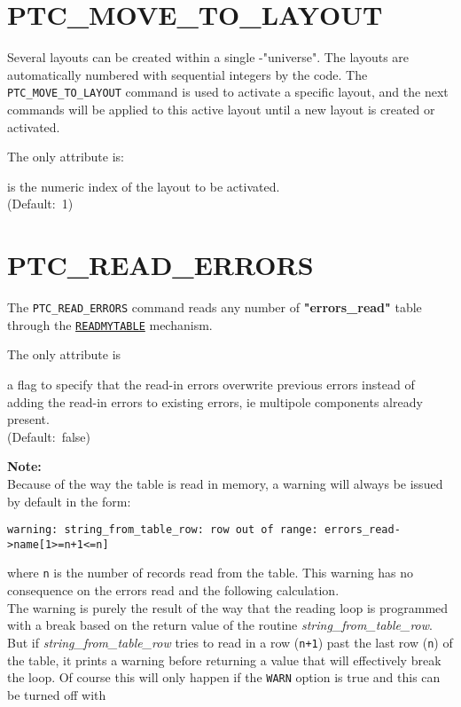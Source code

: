 \section{PTC\_MOVE\_TO\_LAYOUT}
\label{sec:ptc-move-to-layout}

Several \ptc layouts can be created within a single \ptc-"universe". 
The layouts are automatically numbered with sequential integers by the 
\madx code. The {\tt PTC\_MOVE\_TO\_LAYOUT} command is used to
activate a specific layout, and the next \ptc commands will be
applied to this active \ptc layout until a new \ptc layout is created
or activated. 


The only attribute is:
\begin{madlist}
	 is the numeric index of the \ptc layout to be
	activated.\\ (Default:~1)
\end{madlist}

\section{PTC\_READ\_ERRORS}
\label{sec:ptc-read-errors}

The {\tt PTC\_READ\_ERRORS} command reads any number of
\textbf{"errors\_read"} table through the 
\hyperref[sec:readmytable]{\tt READMYTABLE} mechanism.


The only attribute is 
\begin{madlist}
    a flag to specify that the read-in errors
   overwrite previous errors instead of adding the read-in errors to
   existing errors, ie multipole components already present.\\
   (Default:~false)  
\end{madlist}

{\bf Note:}\\
Because of the way the table is read in memory, a warning will always be
issued by default in the form:
\begin{verbatim}
warning: string_from_table_row: row out of range: errors_read->name[1>=n+1<=n]
\end{verbatim}
where {\tt n} is  the number of records read from the table. 
This warning has no consequence on the errors read and the following
calculation. \\
The warning is purely the result of the way that the reading loop is
programmed with a break based on the return value of the routine
{\sl string\_from\_table\_row}.  
But if {\sl string\_from\_table\_row} tries to read in a row ({\tt n+1})
past the last row ({\tt n}) of the table, it prints a warning before
returning a value that will effectively break the loop. Of course this
will only happen if the {\tt WARN} option is true and this can be turned
off with 

